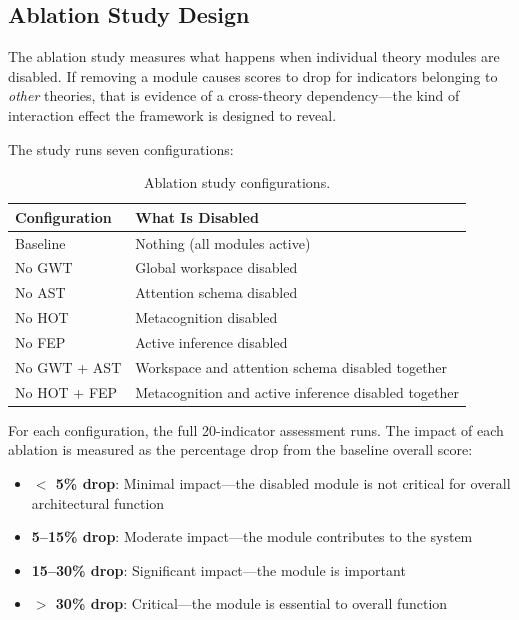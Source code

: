 \subsection{Ablation Study Design}

The ablation study measures what happens when individual theory modules are disabled. If removing a module causes scores to drop for indicators belonging to \textit{other} theories, that is evidence of a cross-theory dependency---the kind of interaction effect the framework is designed to reveal.

The study runs seven configurations:

\begin{table}[t]
\centering
\begin{tabular}{ll}
\toprule
\textbf{Configuration} & \textbf{What Is Disabled} \\
\midrule
Baseline & Nothing (all modules active) \\
No GWT & Global workspace disabled \\
No AST & Attention schema disabled \\
No HOT & Metacognition disabled \\
No FEP & Active inference disabled \\
No GWT + AST & Workspace and attention schema disabled together \\
No HOT + FEP & Metacognition and active inference disabled together \\
\bottomrule
\end{tabular}
\caption{Ablation study configurations.}
\label{tab:ablation-configs}
\end{table}

For each configuration, the full 20-indicator assessment runs. The impact of each ablation is measured as the percentage drop from the baseline overall score:

\begin{itemize}
    \item \textbf{$<$ 5\% drop}: Minimal impact---the disabled module is not critical for overall architectural function
    \item \textbf{5--15\% drop}: Moderate impact---the module contributes to the system
    \item \textbf{15--30\% drop}: Significant impact---the module is important
    \item \textbf{$>$ 30\% drop}: Critical---the module is essential to overall function
\end{itemize}

